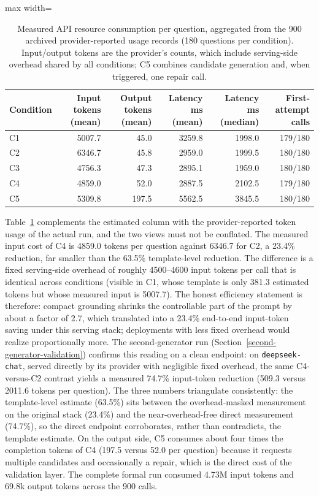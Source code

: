 \documentclass[applsci,article,submit,moreauthors]{Definitions/mdpi}
\begin{document}
\begin{table}[H]
\small{\small}
\caption{Measured API resource consumption per question, aggregated from the 900 archived provider-reported usage records (180 questions per condition). Input/output tokens are the provider's counts, which include serving-side overhead shared by all conditions; C5 combines candidate generation and, when triggered, one repair call.}
\label{tab:real-tokens}
\centering
\begin{adjustbox}{max width=\textwidth}
\begin{tabular}{lrrrrr}
\toprule
\textbf{Condition} & \textbf{Input tokens (mean)} & \textbf{Output tokens (mean)} & \textbf{Latency ms (mean)} & \textbf{Latency ms (median)} & \textbf{First-attempt calls} \\
\midrule
C1 & 5007.7 & 45.0 & 3259.8 & 1998.0 & 179/180 \\
C2 & 6346.7 & 45.8 & 2959.0 & 1999.5 & 180/180 \\
C3 & 4756.3 & 47.3 & 2895.1 & 1959.0 & 180/180 \\
C4 & 4859.0 & 52.0 & 2887.5 & 2102.5 & 179/180 \\
C5 & 5309.8 & 197.5 & 5562.5 & 3845.5 & 180/180 \\
\bottomrule
\end{tabular}
\end{adjustbox}
\end{table}

Table~\ref{tab:real-tokens} complements the estimated column with the provider-reported token usage of the actual run, and the two views must not be conflated. The measured input cost of C4 is 4859.0 tokens per question against 6346.7 for C2, a 23.4\% reduction, far smaller than the 63.5\% template-level reduction. The difference is a fixed serving-side overhead of roughly 4500--4600 input tokens per call that is identical across conditions (visible in C1, whose template is only 381.3 estimated tokens but whose measured input is 5007.7). The honest efficiency statement is therefore: compact grounding shrinks the controllable part of the prompt by about a factor of 2.7, which translated into a 23.4\% end-to-end input-token saving under this serving stack; deployments with less fixed overhead would realize proportionally more. The second-generator run (Section~\ref{second-generator-validation}) confirms this reading on a clean endpoint: on \texttt{deepseek-chat}, served directly by its provider with negligible fixed overhead, the same C4-versus-C2 contrast yields a measured 74.7\% input-token reduction (509.3 versus 2011.6 tokens per question). The three numbers triangulate consistently: the template-level estimate (63.5\%) sits between the overhead-masked measurement on the original stack (23.4\%) and the near-overhead-free direct measurement (74.7\%), so the direct endpoint corroborates, rather than contradicts, the template estimate. On the output side, C5 consumes about four times the completion tokens of C4 (197.5 versus 52.0 per question) because it requests multiple candidates and occasionally a repair, which is the direct cost of the validation layer. The complete formal run consumed 4.73M input tokens and 69.8k output tokens across the 900 calls.
\end{document}
